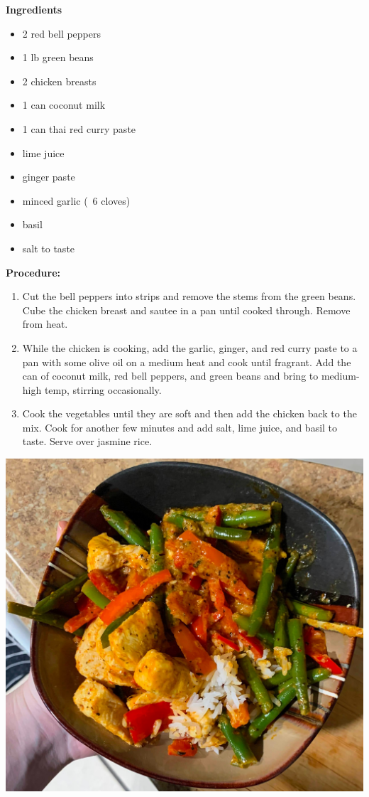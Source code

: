 

\begin{multicols}{2}
\textbf{Ingredients}
\begin{itemize}
\item 2 red bell peppers

\item 1 lb green beans  
\item 2 chicken breasts
\item 1 can coconut milk
\item 1 can thai red curry paste 
\item lime juice
\item ginger paste
\item minced garlic (~6 cloves) 
\item basil 
\item salt to taste



\end{itemize}


\columnbreak
\textbf{Procedure:}
\medskip


\begin{enumerate}

\item Cut the bell peppers into strips and remove the stems from the green beans. Cube the chicken breast and sautee in a pan until cooked through. Remove from heat. 
\medskip

\item While the chicken is cooking, add the garlic, ginger, and red curry paste to a pan with some olive oil on a medium heat and cook until fragrant. Add the can of coconut milk, red bell peppers, and green beans and bring to medium-high temp, stirring occasionally. 
\newline 

 \item Cook the vegetables until they are soft and then add the chicken back to the mix. Cook for another few minutes and add salt,  lime juice, and basil to taste. Serve over jasmine rice. 
\end{enumerate}
\end{multicols}
\centering \includegraphics[scale=0.15]{Chicken Recipes/Thai Red Curry/IMG_8941-EDIT (1).jpg}

